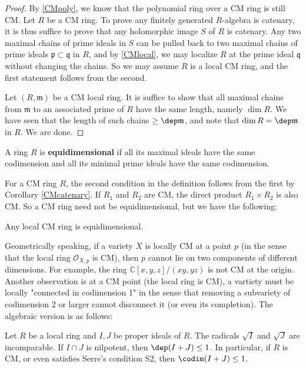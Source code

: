 \begin{proof}
    By \ref{CMpoly}, we know that the polynomial ring over a CM ring is still CM. Let \(R\) be a CM ring. To prove any finitely generated \(R\)-algebra is catenary, it is thus suffice to prove that any holomorphic image \(S\) of \(R\) is catenary. Any two maximal chains of prime ideals in \(S\) can be pulled back to two maximal chains of prime ideals \(\mathfrak{p}\subset \mathfrak{q}\) in \(R\), and by \ref{CMlocal}, we may localize \(R\) at the prime ideal \(\mathfrak{q}\) without changing the chains. So we may assume \(R\) is a local CM ring, and the first statement follows from the second. 

   Let \((R,\mathfrak{m})\) be a CM local ring. It is suffice to show that all maximal chains from \(\mathfrak{m}\) to an associated prime of \(R\) have the same length, namely \(\dim R\). We have seen that the length of such chains \(\geq \dep \mathfrak{m}\), and note that \(\dim R=\dep \mathfrak{m}\) in \(R\). We are done. 
\end{proof}

\begin{definition}[Equidimensional]
     A ring \(R\) is \textbf{equidimensional} if all its maximal ideals have the same codimension and all its minimal prime ideals have the same codimension.
\end{definition}

For a CM ring \(R\), the second condition in the definition follows from the first by Corollary \ref{CMcatenary}. If \(R_1\) and \(R_2\) are CM, the direct product \(R_1\times R_2\) is also CM. So a CM ring need not be equidimensional, but we have the following:

\begin{corollary}
  Any local CM ring is equidimensional.
\end{corollary}

Geometrically speaking, if a variety \(X\) is locally CM at a point \(p\) (in the sense that the local ring \(\mathcal{O}_{X,p}\) is CM), then \(p\) cannot lie on two components of different dimensions. For example, the ring \(\mathbb{C}[x,y,z]/(xy,yz)\) is not CM at the origin. Another observation is at a CM point (the local ring is CM), a vartiety must be locally "connected in codimension 1" in the sense that removing a subvariety of codimension 2 or larger cannot disconnect it (or even its completion). The algebraic version is as follows:

\begin{theorem}
  Let \(R\) be a local ring and \(I, J\) be proper ideals of \(R\). The radicals \(\sqrt{I}\) and \(\sqrt{J}\) are incomparable. If \(I\cap J\) is nilpotent, then \(\dep (I+J)\leq 1\). In particular, if \(R\) is CM, or even satisfies Serre's condition S2, then \(\codim (I+J)\leq 1\).
\end{theorem}

